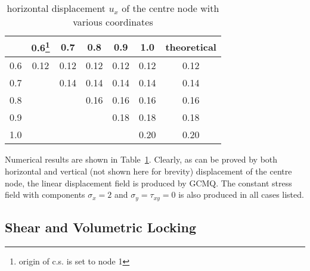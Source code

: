 \documentclass[3p,sort&compress,review,11pt]{elsarticle}
\newcommand*{\tabref}[1]{Table~\ref{#1}}
\begin{document}
\begin{table}[htb]
\centering\scriptsize
\caption{horizontal displacement $u_x$ of the centre node with various coordinates}\label{tab:patch_ii_a}
\begin{tabular}{ccccccc}
	\toprule
	\diagbox{$y$}{$x$} & \num{0.6}\footnote{origin of c.s. is set to node 1} & \num{0.7}  & \num{0.8}  & \num{0.9}  & \num{1.0}  & theoretical \\ \midrule
	    \num{0.6}      &                  \num{0.12}                   & \num{0.12} & \num{0.12} & \num{0.12} & \num{0.12} & \num{0.12}  \\
	    \num{0.7}      &                                               & \num{0.14} & \num{0.14} & \num{0.14} & \num{0.14} & \num{0.14}  \\
	    \num{0.8}      &                                               &            & \num{0.16} & \num{0.16} & \num{0.16} & \num{0.16}  \\
	    \num{0.9}      &                                               &            &            & \num{0.18} & \num{0.18} & \num{0.18}  \\
	    \num{1.0}      &                                               &            &            &            & \num{0.20} & \num{0.20}  \\ \bottomrule
\end{tabular}
\end{table}
Numerical results are shown in \tabref{tab:patch_ii_a}. Clearly, as can be proved by both horizontal and vertical (not shown here for brevity) displacement of the centre node, the linear displacement field is produced by GCMQ. The constant stress field with components $\sigma_x=2$ and $\sigma_y=\tau_{xy}=0$ is also produced in all cases listed.
\subsection{Shear and Volumetric Locking}
\end{document}
